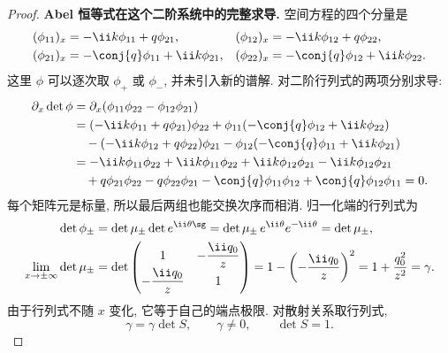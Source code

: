 \begin{proof}

\par\medskip\noindent\textbf{Abel 恒等式在这个二阶系统中的完整求导.}\quad 
空间方程的四个分量是
\begin{align*}
(\phi_{11})_x&=-\ii k\phi_{11}+q\phi_{21},&
(\phi_{12})_x&=-\ii k\phi_{12}+q\phi_{22},\\
(\phi_{21})_x&=-\conj{q}\phi_{11}+\ii k\phi_{21},&
(\phi_{22})_x&=-\conj{q}\phi_{12}+\ii k\phi_{22}.
\end{align*}
这里 $\phi$ 可以逐次取 $\phi_+$ 或 $\phi_-$,
并未引入新的谱解. 对二阶行列式的两项分别求导:
\begin{align*}
\partial_x\det\phi
&=\partial_x(\phi_{11}\phi_{22}-\phi_{12}\phi_{21})\\
&=(-\ii k\phi_{11}+q\phi_{21})\phi_{22}
+\phi_{11}(-\conj{q}\phi_{12}+\ii k\phi_{22})\\
&\quad-(-\ii k\phi_{12}+q\phi_{22})\phi_{21}
-\phi_{12}(-\conj{q}\phi_{11}+\ii k\phi_{21})\\
&=-\ii k\phi_{11}\phi_{22}+\ii k\phi_{11}\phi_{22}
+\ii k\phi_{12}\phi_{21}-\ii k\phi_{12}\phi_{21}\\
&\quad+q\phi_{21}\phi_{22}-q\phi_{22}\phi_{21}
-\conj{q}\phi_{11}\phi_{12}+\conj{q}\phi_{12}\phi_{11}=0.
\end{align*}
每个矩阵元是标量, 所以最后两组也能交换次序而相消.
归一化端的行列式为
\begin{align*}
\det\phi_\pm
&=\det\mu_\pm\det e^{\ii\theta\sg}
=\det\mu_\pm\,e^{\ii\theta}e^{-\ii\theta}
=\det\mu_\pm,\\
\lim\limits_{x\to\pm\infty}\det\mu_\pm
&=\det\begin{pmatrix}1&-\dfrac{\ii q_0}{z}\\
-\dfrac{\ii q_0}{z}&1\end{pmatrix}
=1-\left(-\dfrac{\ii q_0}{z}\right)^2
=1+\dfrac{q_0^2}{z^2}=\gamma.
\end{align*}
由于行列式不随 $x$ 变化, 它等于自己的端点极限.
对散射关系取行列式,
\[
\gamma=\gamma\det S,
\qquad \gamma\ne0,
\qquad \det S=1.
\]


\end{proof}
